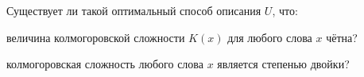 Существует ли такой оптимальный способ описания $U$, что:
\begin{enumcyr}
    \item величина колмогоровской сложности $K(x)$ для любого слова $x$ чётна?
    \item колмогоровская сложность любого слова $x$ является степенью двойки?
\end{enumcyr}